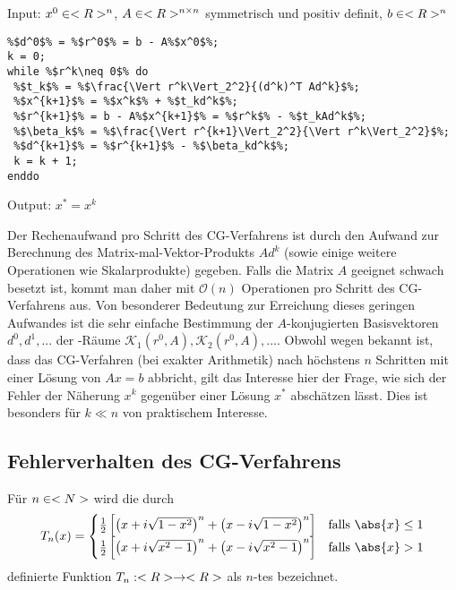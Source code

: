\begin{algorithm}[CG-Verfahren]
	Input: $x^0\in<R>^n$, $A\in<R>^{n \times n}$ symmetrisch und positiv definit, $b\in<R>^n$
	\begin{lstlisting}
%$d^0$% = %$r^0$% = b - A%$x^0$%;
k = 0;
while %$r^k\neq 0$% do
 %$t_k$% = %$\frac{\Vert r^k\Vert_2^2}{(d^k)^T Ad^k}$%;
 %$x^{k+1}$% = %$x^k$% + %$t_kd^k$%;
 %$r^{k+1}$% = b - A%$x^{k+1}$% = %$r^k$% - %$t_kAd^k$%;
 %$\beta_k$% = %$\frac{\Vert r^{k+1}\Vert_2^2}{\Vert r^k\Vert_2^2}$%;
 %$d^{k+1}$% = %$r^{k+1}$% - %$\beta_kd^k$%;
 k = k + 1;
enddo
	\end{lstlisting}
	Output: $x^\ast=x^k$
\end{algorithm}
Der Rechenaufwand pro Schritt des CG-Verfahrens ist durch den Aufwand zur Berechnung des Matrix-mal-Vektor-Produkts $Ad^k$ (sowie einige weitere Operationen wie Skalarprodukte) gegeben. Falls die Matrix $A$ geeignet schwach besetzt ist, kommt man daher mit $\mathcal{O}(n)$ Operationen pro Schritt des CG-Verfahrens aus. Von besonderer Bedeutung zur Erreichung dieses geringen Aufwandes ist die sehr einfache Bestimmung der $A$-konjugierten Basisvektoren $d^0,d^1,...$ der -Räume $\mathcal{K}_1(r^0,A),\mathcal{K}_2(r^0,A),...$. Obwohl wegen  bekannt ist, dass das CG-Verfahren (bei exakter Arithmetik) nach höchstens $n$ Schritten mit einer Lösung von $Ax=b$ abbricht, gilt das Interesse hier der Frage, wie sich der Fehler der Näherung $x^k$ gegenüber einer Lösung $x^\ast$ abschätzen lässt. Dies ist besonders für $k\ll n$ von praktischem Interesse.

\subsection{Fehlerverhalten des CG-Verfahrens}

\begin{definition}
	Für $n\in<N>$ wird die durch
	\begin{align}
		T_n(x) = \begin{cases}
			\frac{1}{2}\left[\left(x+i\sqrt{1-x^2}\right)^n+\left(x-i\sqrt{1-x^2}\right)^n\right]&\text{falls } \abs{x}\le 1 \\
			\frac{1}{2}\left[\left(x+i\sqrt{x^2-1}\right)^n+\left(x-i\sqrt{x^2-1}\right)^n\right]&\text{falls } \abs{x}> 1 \\
		\end{cases}\notag
	\end{align}
	definierte Funktion $T_n:<R>\to<R>$ als $n$-tes  bezeichnet.
\end{definition}

